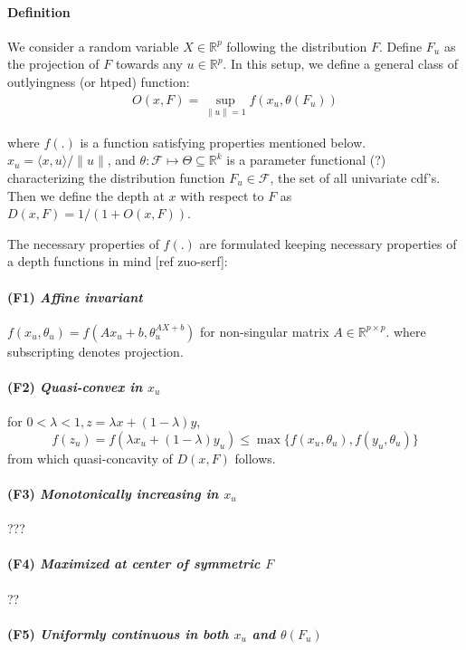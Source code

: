 \documentclass{article}
\begin{document}
\paragraph{Definition}
We consider a random variable $X\in\mathbb{R}^p$ following the distribution $F$. Define $F_u$ as the projection of $F$ towards any $u\in\mathbb{R}^p$. In this setup, we define a general class of outlyingness (or htped) function:
\begin{eqnarray}
O(x,F) = \sup_{\|u\|=1} f(x_u,\theta(F_u))
\end{eqnarray}

where $f(.)$ is a function satisfying properties mentioned below. $x_u=\langle x,u\rangle/\|u\| $, and $\theta:\mathcal{F}\mapsto\Theta \subseteq \mathbb{R}^k$ is a parameter functional (?) characterizing the distribution function $F_u \in \mathcal{F}$, the set of all univariate cdf's. Then we define the depth at $x$ with respect to $F$ as $ D(x,F) = 1/(1+O(x,F)) $.

The necessary properties of $f(.)$ are formulated keeping necessary properties of a depth functions in mind [ref zuo-serf]:
\paragraph{(F1) \textit{Affine invariant}} $f(x_u,\theta_u) = f(Ax_u+b,\theta^{AX+b}_u)$ for non-singular matrix $A\in\mathbb{R}^{p\times p}$.
where subscripting denotes projection.

\paragraph{(F2) \textit{Quasi-convex in $x_u$}} for $0<\lambda<1, z=\lambda x+(1-\lambda)y$,
$$ f(z_u) = f(\lambda x_u+(1-\lambda)y_u) \leq \max\lbrace f(x_u,\theta_u), f(y_u,\theta_u)\rbrace$$
from which quasi-concavity of $D(x,F)$ follows.

\paragraph{(F3) \textit{Monotonically increasing in $x_u$}} ???

\paragraph{(F4) \textit{Maximized at center of symmetric $F$}} ??

\paragraph{(F5) \textit{Uniformly continuous in both $x_u$ and $\theta(F_u)$}}
\end{document}
